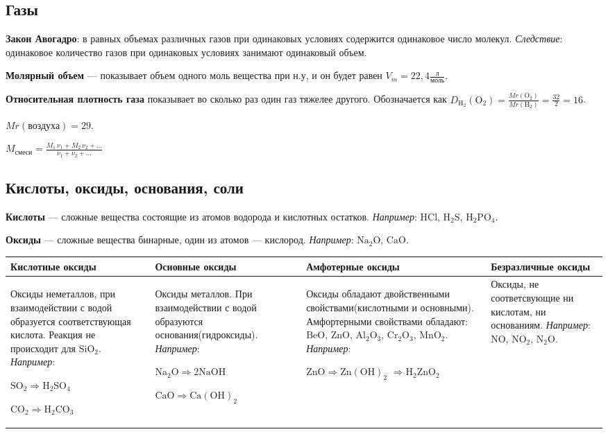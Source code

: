 \documentclass[12pt,a4paper]{article}
\begin{document}

\subsection{Газы}

{\bfseries Закон Авогадро}: в равных объемах различных газов при одинаковых условиях содержится одинаковое число молекул. {\itshape Следствие}: одинаковое количество газов при одинаковых условиях занимают одинаковый объем.

{\bfseries Молярный объем} --- показывает объем одного моль вещества при н.у, и он будет равен $ V_m = 22,4 \frac{\text{л}}{\text{моль}} $.

{\bfseries Относительная плотность газа} показывает во сколько раз один газ тяжелее другого. Обозначается как $ D_{\mathrm{H_2}}(\mathrm{O_2}) = \frac{Mr(\mathrm{O_2})}{Mr(\mathrm{H_2})} = \frac{32}{2} = 16 $.

$ Mr(\text{воздуха}) = 29 $.

$\displaystyle M_{\text{смеси}} = \frac{M_1\,\nu_1 + M_2\,\nu_2 + \dots}{\nu_1 + \nu_2 + \dots} $


\subsection{Кислоты, оксиды, основания, соли}

{\bfseries Кислоты} --- сложные вещества состоящие из атомов водорода и кислотных остатков. {\itshape Например}: $\mathrm{ H Cl }$, $\mathrm{ H_2 S }$, $\mathrm{ H_2 PO_4 }$.

{\bfseries Оксиды} --- сложные вещества бинарные, один из атомов --- кислород. {\itshape Например}: $\mathrm{ Na_2 O }$, $\mathrm{ CaO }$.

\noindent\begin{tabular}[t]{||p{3.85cm}|p{3.4cm}|p{3.9cm}|p{3.2cm}||}
\hline
	Кислотные оксиды & Основные оксиды & Амфотерные оксиды & Безразличные оксиды \tabularnewline
\hline
	Оксиды неметаллов, при взаимодействии с водой образуется соответствующая кислота. Реакция не происходит для $\mathrm{Si O_2}$. {\itshape Например}: 
	
	$\mathrm{S O_2 \Rightarrow H_2 S O_4}$
	
	$\mathrm{C O_2 \Rightarrow H_2 C O_3}$ &
	Оксиды металлов. При взаимодействии с водой образуются основания(гидроксиды). {\itshape Например}: 
	
	$\mathrm{Na_2 O \Rightarrow 2Na O H}$
	
	$\mathrm{Ca O \Rightarrow Ca(O H)_2}$  &
	Оксиды обладают двойственными свойствами(кислотными и основными). Амфортерными свойствами обладают: $\mathrm{Be O}$, $\mathrm{Zn O}$, $\mathrm{Al_2 O_3}$, $\mathrm{Cr_2 O_3}$, $\mathrm{Mn O_2}$. {\itshape Например}: 
	
	$\mathrm{Zn O \Rightarrow Zn(O H)_2 }$ $\mathrm{\Rightarrow H_2 Zn O_2}$ &
	Оксиды, не соответсвующие ни кислотам, ни основаниям. {\itshape Например}: $\mathrm{N O}$, $\mathrm{N O_2}$, $\mathrm{N_2 O}$. \tabularnewline
\hline
\end{tabular}
\end{document}
